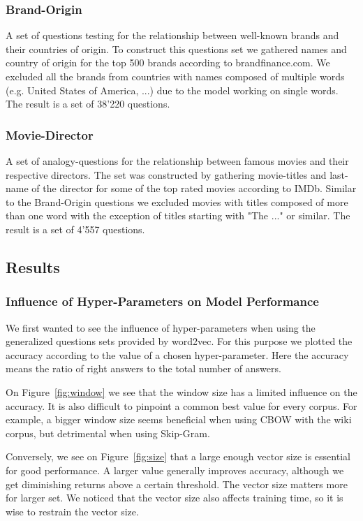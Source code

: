 \documentclass[conference]{IEEEtran}
\begin{document}
\subsubsection{Brand-Origin}
A set of questions testing for the relationship between well-known brands and their countries
of origin. To construct this questions set we gathered names and country of origin for 
the top 500 brands according to brandfinance.com. We excluded all the brands from countries
with names composed of multiple words (e.g. United States of America, ...) due to the model 
working on single words. The result is a set of 38'220 questions.

\subsubsection{Movie-Director}
A set of analogy-questions for the relationship between famous movies and their respective 
directors. The set was constructed by gathering movie-titles and last-name of the director for 
some of the top rated movies according to IMDb. Similar to the Brand-Origin questions we 
excluded movies with titles composed of more than one word with the exception of titles
starting with "The ..." or similar.  The result is a set of 4'557 questions.


\subsection{Results}

\subsubsection{Influence of Hyper-Parameters on Model Performance}
We first wanted to see the influence of hyper-parameters when using the generalized questions sets provided by word2vec.
For this purpose we plotted the accuracy according to the value of a chosen hyper-parameter.
Here the accuracy means the ratio of right answers to the total number of answers.

On Figure~\ref{fig:window} we see that the window size has a limited influence on the accuracy.
It is also difficult to pinpoint a common best value for every corpus.
For example, a bigger window size seems beneficial when using CBOW with the wiki corpus, but detrimental when using Skip-Gram.

Conversely, we see on Figure~\ref{fig:size} that a large enough vector size is essential for good performance.
A larger value generally improves accuracy, although we get diminishing returns above a certain threshold.
The vector size matters more for larger set.
We noticed that the vector size also affects training time, so it is wise to restrain the vector size.
\end{document}

